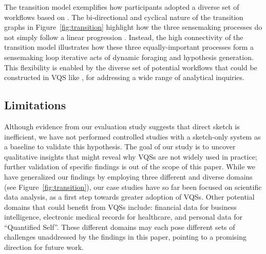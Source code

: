 \par The  transition model exemplifies how participants
adopted a diverse set of workflows
based on . The bi-directional and cyclical nature
of the transition graphs in Figure~\ref{fig:transition} highlight how the three sensemaking processes do not simply follow a linear progression . %
Instead, the high connectivity of the transition model illustrates how these three equally-important processes form a sensemaking loop iterative acts of dynamic foraging and hypothesis generation. This flexibility is enabled by the diverse set of potential workflows that could be constructed in  VQS like \zvpp, for addressing a wide range of analytical inquiries.%
\subsection{Limitations}
\par Although evidence from our evaluation study
suggests that direct sketch is inefficient,
we have not performed controlled studies
with a sketch-only system as a baseline to validate this hypothesis.
The goal of our study is to uncover qualitative insights
that might reveal why VQSs are not widely used in practice;
further validation of specific findings is out of the scope of this paper.  While we have generalized our findings by employing
three different and diverse domains (see Figure~\ref{fig:transition}),
our case studies have so far
been focused on scientific data analysis,
as a first step towards greater adoption of VQSs.
Other potential domains that could benefit from VQSs include:
financial data for business intelligence,
electronic medical records for healthcare,
and personal data for ``Quantified Self''.
These different domains may each pose different
 sets of challenges unaddressed
 by the findings in this paper,
 pointing to a promising direction for future work.
